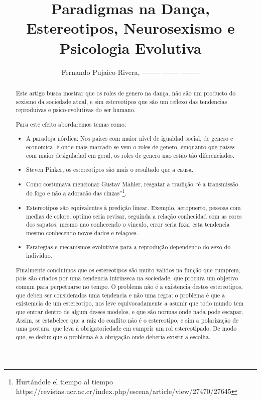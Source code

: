 \documentclass[a4paper,10pt]{article}
\title{Paradigmas na Dança, Estereotipos, Neurosexismo e Psicologia Evolutiva}
\author{Fernando Pujaico Rivera, -------- -------- --------}
\begin{document}
\maketitle

\begin{abstract}

Este artigo busca mostrar que os roles de genero na dança,
não são um producto do sexismo da sociedade atual, 
e sim estereotipos que são um reflexo das tendencias 
reproduivas e psico-evolutivas do ser humano.

Para este efeito abordaremos temas como:

\begin{itemize}
\item A paradoja nórdica: Nos paises com maior nivel de igualdad social, 
de genero e economica, é onde mais marcado se vem o roles de genero,
emquanto que paises com maior desiguladad em geral,
os roles de genero nao estão tão diferenciados.

\item Steven Pinker, os estereotipos são mais o resultado que a causa.

\item  Como costumava mencionar Gustav Mahler, resgatar 
a tradição ``é a transmissão do fogo e não 
a adoracão das cinzas''\footnote{Hurtándole el tiempo al tiempo https://revistas.ucr.ac.cr/index.php/escena/article/view/27470/27645}.

\item Estereotipos são equivalentes à predição linear. Exemplo, aeropuerto, 
pessoas com medias de colore, optimo seria revisar, seguinda a relação 
conhecidad com as cores dos sapatos, mesmo nao conhecendo o vinculo,
error seria fixar esta tendencia mesmo conhecendo novos dados e relaçoes.

\item Esrategias e mecanismos evolutivos para a reprodução dependendo do sexo do individuo.

\end{itemize}
Finalmente concluimos que os estereotipos são muito validos na função que cumprem, 
pois são criados por uma tendencia intrinseca na sociedade,
que procura um objetivo comum para perpetuarse no tempo. 
O problema não é a existencia destos estereotipos, 
que deben ser considerados uma tendencia e não uma regra;
o problema é que a existemcia de um estereotipo, 
nos leve equivocadamente a asumir que todo mundo tem que entrar dentro de algum desses modelos,
e que são normas onde nada pode escapar.
Assim, se estabelece que a raiz do conflito não é o estereotipo, 
e sim a polarização de uma postura, 
que leva à obrigatoriedade em cumprir um rol estereotipado.
De modo que, se deduz que o problema é a obrigação onde deberia existir a escolha.

\end{abstract}
\end{document}
